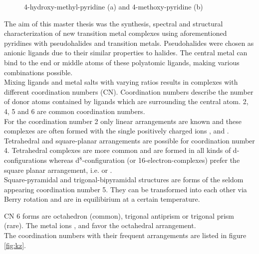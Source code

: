 \begin{figure}[htpb!]
\caption{4-hydroxy-methyl-pyridine (a) and 4-methoxy-pyridine (b)}
\label{fig:4mophomp}
\end{figure}

The aim of this master thesis was the synthesis, spectral and structural characterization of new transition metal complexes using aforementioned pyridines with pseudohalides and transition metals.
Pseudohalides were chosen  as anionic ligands due to their similar properties to halides.  The central metal can bind to the end or middle atoms of these polyatomic ligands, making various combinations possible.\\

Mixing ligands and metal salts with varying ratios results in complexes with different coordination numbers (CN). Coordination numbers describe the number of donor atoms contained by ligands which are surrounding the central atom. 2, 4, 5 and 6 are common coordination numbers.\\

For the coordination number 2 only linear arrangements are  known and these complexes are often formed with the single positively charged ions ,  and . \cite{riedel} \\

Tetrahedral and square-planar arrangements are possible for coordination number 4. Tetrahedral complexes are more common and are formed in all kinds of d-configurations whereas d$^8$-configuration (or 16-electron-complexes) prefer the square planar arrangement, i.e.  or . \cite{riedel}   \\

Square-pyramidal and trigonal-bipyramidal structures are forms of the seldom appearing coordination number 5. They can be transformed into each other via Berry rotation \cite{berry} and are in equilibirium at a certain temperature.

CN 6 forms are octahedron (common), trigonal antiprism or trigonal prism (rare). The metal ions ,  and   favor the octahedral arrangement.\cite{riedel} \\

 
 The coordination numbers with their frequent arrangements are listed in figure \ref{fig:kz}.

